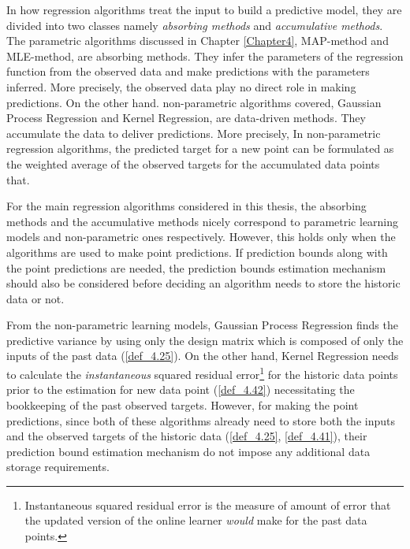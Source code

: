 In how regression algorithms treat the input to build a predictive model, they are divided into two classes namely \textit{absorbing methods} and \textit{accumulative methods}. The parametric algorithms discussed in Chapter \ref{Chapter4}, MAP-method and MLE-method, are absorbing methods. They infer the parameters of the regression function from the observed data and make predictions with the parameters inferred. More precisely, the observed data play no direct role in making predictions. On the other hand. non-parametric algorithms covered, Gaussian Process Regression and Kernel Regression, are data-driven methods. They accumulate the data to deliver predictions. More precisely, In non-parametric regression algorithms, the predicted target for a new point can be formulated as the weighted average of the observed targets for the accumulated data points that.

For the main regression algorithms considered in this thesis, the absorbing methods and the accumulative methods nicely correspond to parametric learning models and non-parametric ones respectively. However, this holds only when the algorithms are used to make point predictions. If prediction bounds along with the point predictions are needed, the prediction bounds estimation mechanism should also be considered before deciding an algorithm needs to store the historic data or not. 

From the non-parametric learning models, Gaussian Process Regression finds the predictive variance by using only the design matrix which is composed of only the inputs of the past data (\ref{def_4.25}). On the other hand, Kernel Regression needs to calculate the \textit{instantaneous} squared residual error\footnote{Instantaneous squared residual error is the measure of amount of error that the updated version of the online learner \textit{would} make for the past data points.} for the historic data points prior to the estimation for new data point (\ref{def_4.42}) necessitating the bookkeeping of the past observed targets. However, for making the point predictions, since both of these algorithms already need to store both the inputs and the observed targets of the historic data (\ref{def_4.25}, \ref{def_4.41}), their prediction bound estimation mechanism do not impose any additional data storage requirements. 

